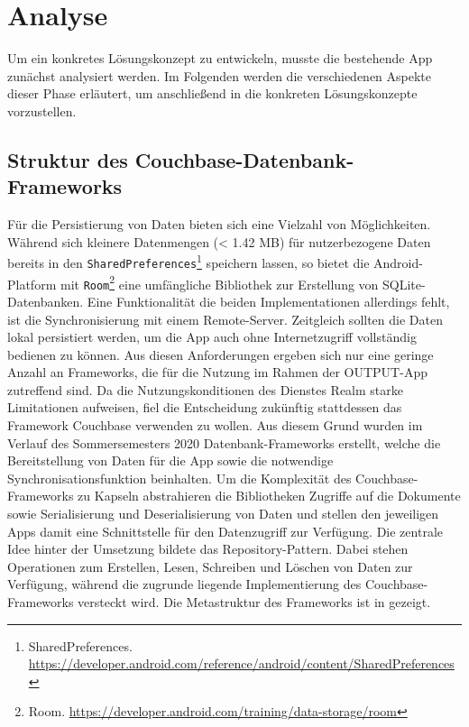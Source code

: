 \chapter{Analyse}\label{ch:analyse}

Um ein konkretes Lösungskonzept zu entwickeln, musste die bestehende App zunächst analysiert werden. Im Folgenden werden die verschiedenen Aspekte dieser Phase erläutert, um anschließend in  die konkreten Lösungskonzepte vorzustellen.

\section{Struktur des Couchbase-Datenbank-Frameworks}\label{sec:couchbase-framework}

Für die Persistierung von Daten bieten sich eine Vielzahl von Möglichkeiten. Während sich kleinere Datenmengen (< 1.42 MB) für nutzerbezogene Daten bereits in den \texttt{SharedPreferences}\footnote{SharedPreferences. \url{https://developer.android.com/reference/android/content/SharedPreferences}} speichern lassen, so bietet die Android-Platform mit \texttt{Room}\footnote{Room. \url{https://developer.android.com/training/data-storage/room}} eine umfängliche Bibliothek zur Erstellung von SQLite-Datenbanken. Eine Funktionalität die beiden Implementationen allerdings fehlt, ist die Synchronisierung mit einem Remote-Server. Zeitgleich sollten die Daten lokal persistiert werden, um die App auch ohne Internetzugriff vollständig bedienen zu können. Aus diesen Anforderungen ergeben sich nur eine geringe Anzahl an Frameworks, die für die Nutzung im Rahmen der OUTPUT-App zutreffend sind. Da die Nutzungskonditionen des Dienstes Realm starke Limitationen aufweisen, fiel die Entscheidung zukünftig stattdessen das Framework Couchbase verwenden zu wollen. Aus diesem Grund wurden im Verlauf des Sommersemesters 2020 Datenbank-Frameworks erstellt, welche die Bereitstellung von Daten für die App sowie die notwendige Synchronisationsfunktion beinhalten. Um die Komplexität des Couchbase-Frameworks zu Kapseln abstrahieren die Bibliotheken Zugriffe auf die Dokumente sowie Serialisierung und Deserialisierung von Daten und stellen den jeweiligen Apps damit eine Schnittstelle für den Datenzugriff zur Verfügung. Die zentrale Idee hinter der Umsetzung bildete das Repository-Pattern. Dabei stehen Operationen zum Erstellen, Lesen, Schreiben und Löschen von Daten zur Verfügung, während die zugrunde liegende Implementierung des Couchbase-Frameworks versteckt wird. Die Metastruktur des Frameworks ist in  gezeigt.

